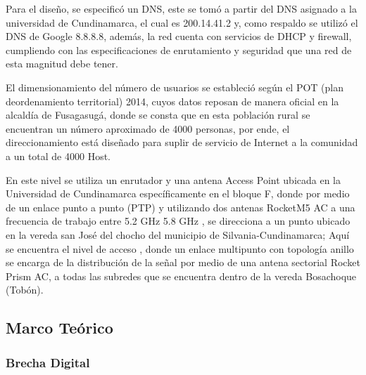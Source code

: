 \documentclass[]{article}
\begin{document}
Para el diseño, se especificó un DNS, este se tomó a partir del DNS
asignado a la universidad de Cundinamarca, el cual es 200.14.41.2 y,
como respaldo se utilizó el DNS de Google 8.8.8.8, además, la red cuenta
con servicios de DHCP y firewall, cumpliendo con las especificaciones de
enrutamiento y seguridad que una red de esta magnitud debe tener.

El dimensionamiento del número de usuarios se estableció según el POT
(plan deordenamiento territorial) 2014, cuyos datos reposan de manera
oficial en la alcaldía de Fusagasugá, donde se consta que en esta
población rural se encuentran un número aproximado de 4000 personas, por
ende, el direccionamiento está diseñado para suplir de servicio de
Internet a la comunidad a un total de 4000 Host.

En este nivel se utiliza un enrutador y una antena Access Point ubicada
en la Universidad de Cundinamarca específicamente en el bloque F, donde
por medio de un enlace punto a punto (PTP) y utilizando dos antenas
RocketM5 AC a una frecuencia de trabajo entre 5.2 GHz 5.8 GHz , se
direcciona a un punto ubicado en la vereda san José del chocho del
municipio de Silvania-Cundinamarca; Aquí se encuentra el nivel de acceso
, donde un enlace multipunto con topología anillo se encarga de la
distribución de la señal por medio de una antena sectorial Rocket Prism
AC, a todas las subredes que se encuentra dentro de la vereda Bosachoque
(Tobón).

\subsection{Marco Teórico}\label{marco-teuxf3rico}

\subsubsection{Brecha Digital}\label{brecha-digital}
\end{document}

